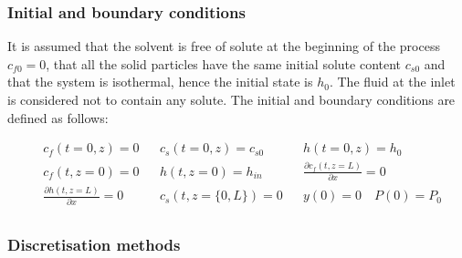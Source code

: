 \documentclass[a4paper,fleqn]{cas-dc}
\begin{document}
		\subsubsection{Initial and boundary conditions} 
		It is assumed that the solvent is free of solute at the beginning of the process $c_{f0}=0$, that all the solid particles have the same initial solute content $c_{s0}$ and that the system is isothermal, hence the initial state is $h_0$. The fluid at the inlet is considered not to contain any solute. The initial and boundary conditions are defined as follows:
		
		{\footnotesize
			\begin{align*}
				&c_f(t = 0, z) = 0  && c_s(t = 0, z) = c_{s0} && h(t = 0, z) = h_0 \\
				&c_f(t,   z=0) = 0  && h(t, z=0) = h_{in}  && \frac{\partial c_f(t,z=L)}{\partial x} = 0 \\
				&\frac{\partial h(t,z=L)}{\partial x} = 0   && c_s(t, z=\{0,L\}) = 0 && y(0) = 0 \quad P(0) = P_0 \\
		\end{align*} }
		
		\subsubsection{Discretisation methods}
		
\end{document}
